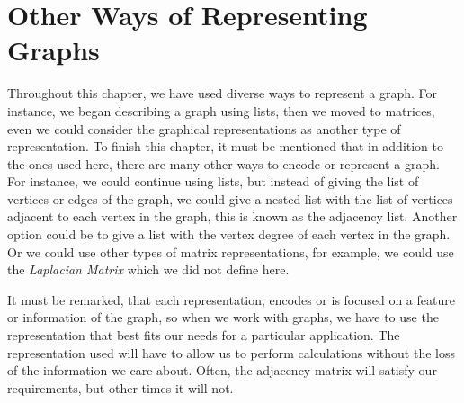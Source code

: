 \section{Other Ways of Representing Graphs}
\label{representations}
Throughout this chapter, we have used diverse ways to represent a graph. For instance, we began describing a graph using lists, then we moved to matrices, even we could consider the graphical representations as another type of representation. To finish this chapter, it must be mentioned that in addition to the ones used here, there are many other ways to encode or represent a graph. For instance, we could continue using lists, but instead of giving the list of vertices or edges of the graph, we could give a nested list with the list of vertices adjacent to each vertex in the graph, this is known as the adjacency list. Another option could be to give a list with the vertex degree of each vertex in the graph. Or we could use other types of matrix representations, for example, we could use the \textit{Laplacian Matrix} which we did not define here.

It must be remarked, that each representation, encodes or is focused on a feature or information of the graph, so when we work with graphs, we have to use the representation that best fits our needs for a particular application. The representation used will have to allow us to perform calculations without the loss of the information we care about. Often, the adjacency matrix will satisfy our requirements, but other times it will not.


